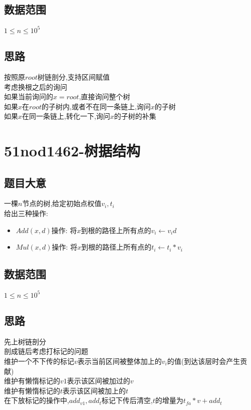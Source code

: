 \documentclass{ctexart}
\numberwithin{equation}{section}
\begin{document}
\begin{flushleft}
  \subsection{数据范围}
  $1\le n\le10^5$\\
  \subsection{思路}
  按照原$root$树链剖分,支持区间赋值\\
  考虑换根之后的询问\\
  如果当前询问的$x = root$,直接询问整个树\\
  如果$x$在$root$的子树内,或者不在同一条链上,询问$x$的子树\\
  如果$x$在同一条链上,转化一下,询问$x$的子树的补集\\
  \newpage

  \section{51nod1462-树据结构}
  \subsection{题目大意}
  一棵$n$节点的树,给定初始点权值$v_i,t_i$\\
  给出三种操作:\\
  \begin{itemize}
  \item $Add(x,d)$操作: 将$x$到根的路径上所有点的$v_i\leftarrow v_id$
  \item $Mul(x,d)$操作: 将$x$到根的路径上所有点的$t_i\leftarrow t_i*v_i$
  \end{itemize}
  \subsection{数据范围}
  $1\le n\le10^5$\\
  \subsection{思路}
  先上树链剖分\\
  剖成链后考虑打标记的问题\\
  维护一个不下传的标记$v$表示当前区间被整体加上的$v_i$的值(到达该层时会产生贡献)\\
  维护有懒惰标记的$v1$表示该区间被加过的$v$\\
  维护有懒惰标记的$t$表示该区间被加上的$t$\\
  在下放标记的操作中,$add_{v1},add_t$标记下传后清空,$t$的增量为$t_{fa}*v+add_t$\\
  \newpage


\end{flushleft}
\end{document}
